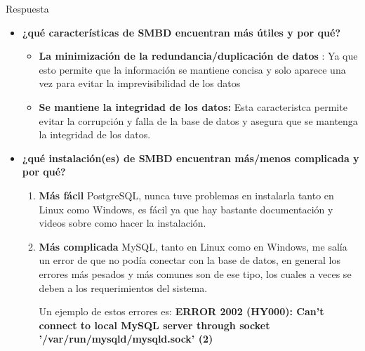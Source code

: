 \documentclass{article}
\begin{document}
\begin{enumerate}
    Respuesta
    \begin{itemize}
        \item \textbf{¿qué características de SMBD encuentran más útiles y por qué?}\\
        
        \begin{itemize}
            \item \textbf{La minimización de la redundancia/duplicación de datos} :
            Ya que esto permite que la información se mantiene concisa y solo aparece una vez para evitar la imprevisibilidad de los datos \\
            
            \item \textbf{Se mantiene la integridad de los datos:}
            Esta caracteristca permite evitar la corrupción y falla de la base de datos y asegura que se mantenga la integridad de los datos.
            
        \end{itemize}
        
        \item \textbf{ ¿qué instalación(es) de SMBD encuentran más/menos complicada y por qué?}
        \begin{enumerate}
            \item \textbf{Más fácil}
            PostgreSQL, nunca tuve problemas en instalarla tanto en Linux como Windows, es fácil ya que hay bastante documentación y videos sobre como hacer la instalación.
            \item \textbf{Más complicada}
            MySQL, tanto en Linux como en Windows, me salía un error de que no podía conectar con la base de datos, en general los errores más pesados y más comunes son de ese tipo, los cuales a veces se deben a los requerimientos del sistema.
            
            Un ejemplo de estos errores es:
            \textbf{ERROR 2002 (HY000): Can't connect to local MySQL server through socket '/var/run/mysqld/mysqld.sock' (2)}
        \end{enumerate}
        

\end{itemize}
\end{enumerate}
\end{document}
